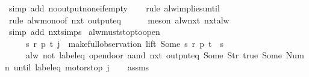 \begin{isabellebody}
\ {\isacharparenleft}simp\ add{\isacharcolon}\ no{\isacharunderscore}output{\isacharunderscore}none{\isacharunderscore}if{\isacharunderscore}empty{\isacharparenright}\isanewline
\ \ \isamarkupfalse%
\ {\isacharparenleft}rule\ alw{\isacharunderscore}implies{\isacharunderscore}until{\isacharparenright}\isanewline
\ \ \isamarkupfalse%
\ {\isacharparenleft}rule\ alw{\isacharunderscore}mono{\isacharbrackleft}of\ {\isachardoublequoteopen}nxt\ {\isacharparenleft}output{\isacharunderscore}eq\ {\isacharbrackleft}{\isacharbrackright}{\isacharparenright}{\isachardoublequoteclose}{\isacharbrackright}{\isacharparenright}\isanewline
\ \ \ \isamarkupfalse%
\ {\isacharparenleft}meson\ alw{\isacharunderscore}nxt\ nxt{\isacharunderscore}alw{\isacharparenright}\isanewline
\ \ \isamarkupfalse%
\ {\isacharparenleft}simp\ add{\isacharcolon}\ nxt{\isachardot}simps{\isacharparenright}%
\endisatagproof
{\isafoldproof}%
%
\isadelimproof
\isanewline
%
\endisadelimproof
\isanewline
\isanewline
\isanewline
\isanewline
{}\isamarkupfalse%
\ alw{\isacharunderscore}must{\isacharunderscore}stop{\isacharunderscore}to{\isacharunderscore}open{\isacharcolon}\isanewline
\ \ \ \ \ {\isachardoublequoteopen}{\isasymexists}s\ r\ p\ t{\isachardot}\ j\ {\isacharequal}\ {\isacharparenleft}make{\isacharunderscore}full{\isacharunderscore}observation\ lift\ {\isacharparenleft}Some\ s{\isacharparenright}\ r\ p\ t{\isacharparenright}\ {\isasymand}\ s\ {\isasymnotin}\ {\isacharbraceleft}{}{\isacharcomma}\ {}{\isacharcomma}\ {}{\isacharcomma}\ {}{\isacharbraceright}{\isachardoublequoteclose}\isanewline
\ \ \ \ \ {\isachardoublequoteopen}alw\ {\isacharparenleft}{\isacharparenleft}not\ {\isacharparenleft}label{\isacharunderscore}eq\ {\isacharprime}{\isacharprime}opendoor{\isacharprime}{\isacharprime}\ aand\ nxt\ {\isacharparenleft}output{\isacharunderscore}eq\ {\isacharbrackleft}Some\ {\isacharparenleft}Str\ {\isacharprime}{\isacharprime}true{\isacharprime}{\isacharprime}{\isacharparenright}{\isacharcomma}\ Some\ {\isacharparenleft}Num\ n{\isacharparenright}{\isacharbrackright}{\isacharparenright}{\isacharparenright}{\isacharparenright}\ until\ {\isacharparenleft}label{\isacharunderscore}eq\ {\isacharprime}{\isacharprime}motorstop{\isacharprime}{\isacharprime}{\isacharparenright}{\isacharparenright}\ j{\isachardoublequoteclose}\isanewline
%
\isadelimproof
\ \ %
\endisadelimproof
%
\isatagproof
{}\isamarkupfalse%
\ assms\ \isamarkupfalse%

\end{isabellebody}

